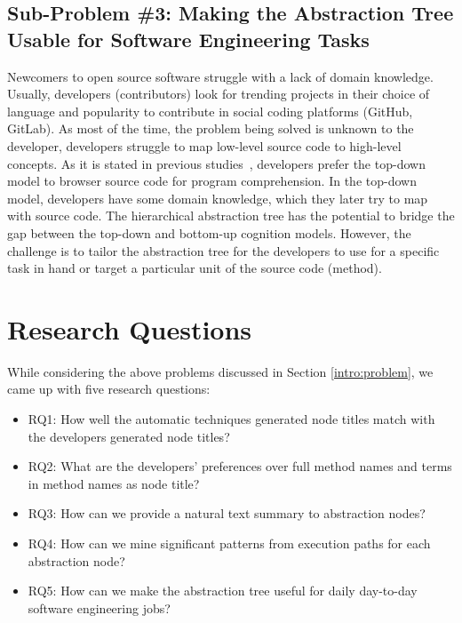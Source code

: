    \subsection{Sub-Problem \#3: Making the Abstraction Tree Usable for Software Engineering Tasks} 
    
    Newcomers to open source software struggle with a lack of domain knowledge. Usually, developers (contributors) look for trending projects in their choice of language and popularity to contribute in social coding platforms (GitHub, GitLab). As most of the time, the problem being solved is unknown to the developer, developers struggle to map low-level source code to high-level concepts. As it is stated in previous studies~\cite{brooks1983theoryComprehensionPrograms}, developers prefer the top-down model to browser source code for program comprehension. In the top-down model, developers have some domain knowledge, which they later try to map with source code. The hierarchical abstraction tree has the potential to bridge the gap between the top-down and bottom-up cognition models. However, the challenge is to tailor the abstraction tree for the developers to use for a specific task in hand or target a particular unit of the source code (method). 
    
    
\section{Research Questions}   
\label{intro:research_questions}
While considering the above problems discussed in Section \ref{intro:problem}, we came up with five research questions:
\begin{itemize}
    \item RQ1:  How well the automatic techniques generated node titles match with the developers generated node titles?
    \item RQ2: What are the developers' preferences over full method names and terms in method names as node title?
    \item RQ3: How can we provide a natural text summary to abstraction nodes?
    \item RQ4: How can we mine significant patterns from execution paths for each abstraction node?
    \item RQ5: How can we make the abstraction tree useful for daily day-to-day software engineering jobs?
    
\end{itemize}

